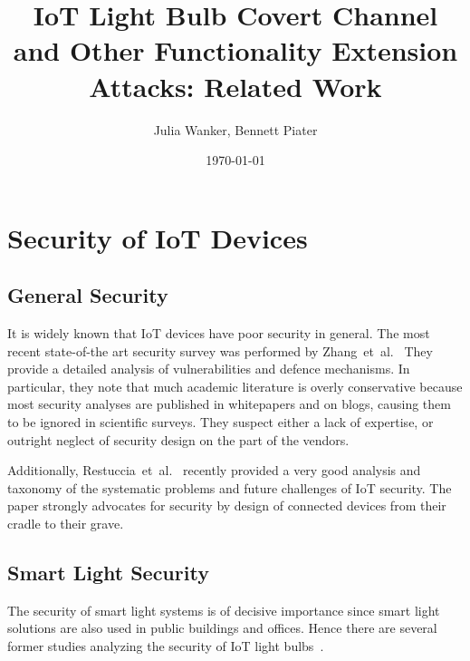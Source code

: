 \documentclass[11pt,a4paper]{article}
\begin{document}
	\title{IoT Light Bulb Covert Channel and Other Functionality Extension Attacks: Related Work}
	\author{Julia Wanker, Bennett Piater}
	\date{\today}
	\maketitle

	\section{Security of IoT Devices}%
	\label{sec:security_of_iot_devices}

	\subsection{General Security}%
	\label{sub:general_security}


  It is widely known that IoT devices have poor security in general.
	The most recent state-of-the art security survey was performed by
	Zhang~et~al.~\cite{Zhang:2017:UISTDCBWWNaWWG} %
	They provide a detailed analysis of vulnerabilities and defence mechanisms.
	In particular, they note that much academic literature is overly conservative because most security analyses are published in whitepapers and on blogs, causing them to be ignored in scientific surveys.
	They suspect either a lack of expertise, or outright neglect of security design on the part of the vendors.

	Additionally,
	Restuccia~et~al.~\cite{Restuccia:2018:SITNPaRC} %
	recently provided a very good analysis and taxonomy of the systematic problems and future challenges of IoT security. The paper strongly advocates for security by design of connected devices from their cradle to their grave.

	\subsection{Smart Light Security}%
	\label{sub:smart_light_security}
	The security of smart light systems is of decisive importance since smart light solutions are also used in public buildings and offices. Hence there are several former studies analyzing the security of IoT light bulbs~\cite{Dhanjani:2013:HLSEPHPWLS, Morgner:2016:AYBBUICSSCLS, Ronen:2018:IGNCZCR}.
\end{document}
